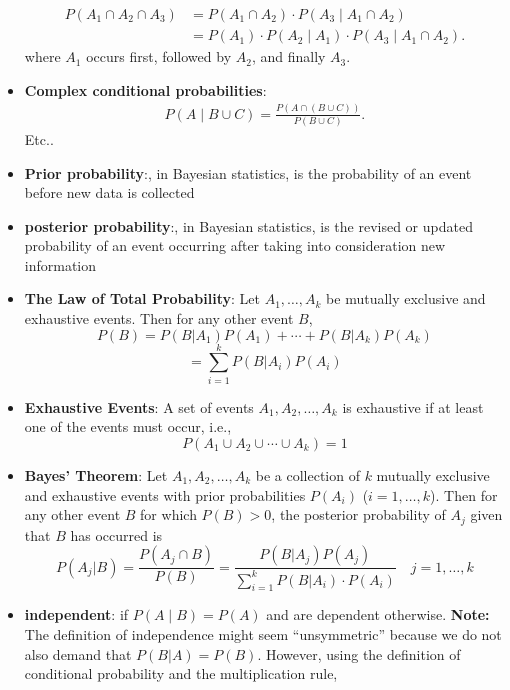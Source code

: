 \documentclass{report}
\begin{document}
\begin{itemize}
\begin{align*}
                P(A_{1} \cap A_{2} \cap A_{3}) &= P(A_{1} \cap A_{2}) \cdot P(A_{3} \mid A_{1} \cap A_{2}) \\
                &=P(A_{1}) \cdot P(A_{2} \mid A_{1}) \cdot P(A_{3} \mid A_{1} \cap A_{2})
            .\end{align*}
            where $A_{1}$ occurs first, followed by $A_{2}$, and finally $A_{3}$.
        \item \textbf{Complex conditional probabilities}: 
            \begin{align*}
                P(A \mid B \cup C) = \frac{P(A\cap (B\cup C))}{P(B\cup C)}
            .\end{align*}
            Etc..
        \item \textbf{Prior probability}:, in Bayesian statistics, is the probability of an event before new data is collected
        \item \textbf{posterior probability}:, in Bayesian statistics, is the revised or updated probability of an event occurring after taking into consideration new information
        \item \textbf{The Law of Total Probability}:
            Let \( A_1, \ldots, A_k \) be mutually exclusive and exhaustive events. Then for any other event \( B \),
            \[
                P(B) = P(B|A_1)P(A_1) + \cdots + P(B|A_k)P(A_k)
            \]
            \[
                = \sum_{i=1}^{k} P(B|A_i)P(A_i) 
            \]
        \item \textbf{Exhaustive Events}: A set of events \( A_1, A_2, \ldots, A_k \) is exhaustive if at least one of the events must occur, i.e.,
            \[
                P(A_1 \cup A_2 \cup \cdots \cup A_k) = 1
            \]
        \item \textbf{Bayes' Theorem}:
            Let \( A_1, A_2, \ldots, A_k \) be a collection of \( k \) mutually exclusive and exhaustive events with prior probabilities \( P(A_i) \) (\( i = 1, \ldots, k \)). Then for any other event \( B \) for which \( P(B) > 0 \), the posterior probability of \( A_j \) given that \( B \) has occurred is
            \[
                P(A_j|B) = \frac{P(A_j \cap B)}{P(B)} = \frac{P(B|A_j)P(A_j)}{\sum_{i=1}^{k} P(B|A_i) \cdot P(A_i)} \quad j = 1, \ldots, k
            \]
        \item \textbf{independent}: if $P(A\mid B)  = P(A)$ and are dependent otherwise.
            \bigbreak \noindent 
            \textbf{Note:} The definition of independence might seem “unsymmetric” because we do not also demand that \( P(B|A) = P(B) \). However, using the definition of conditional probability and the multiplication rule,

\end{itemize}
\end{document}
